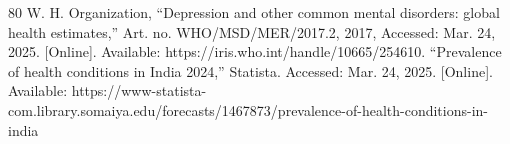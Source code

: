 
\renewcommand{\bibname}{References} %
\begin{small}

\begin{thebibliography}{80}
		W. H. Organization, “Depression and other common mental disorders: global health estimates,” Art. no. WHO/MSD/MER/2017.2, 2017, Accessed: Mar. 24, 2025. [Online]. Available: https://iris.who.int/handle/10665/254610.
		“Prevalence of health conditions in India 2024,” Statista. Accessed: Mar. 24, 2025. [Online]. Available: https://www-statista-com.library.somaiya.edu/forecasts/1467873/prevalence-of-health-conditions-in-india
	
\end{thebibliography}
\end{small}